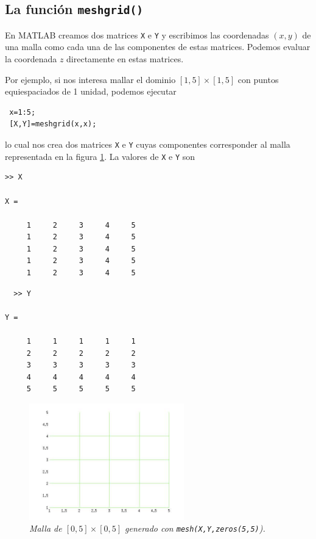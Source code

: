 \documentclass[11pt]{article}
\begin{document}
\subsection{La funci\'on \texttt{meshgrid()}}

En MATLAB creamos dos matrices \texttt{X} e \texttt{Y} y escribimos las coordenadas $(x,y)$ 
de una malla como cada una de las componentes de estas matrices. Podemos evaluar la coordenada $z$ directamente 
en estas matrices.

Por ejemplo, si nos interesa mallar el dominio $[1,5]\times[1,5]$ con puntos equiespaciados 
de 1 unidad, podemos ejecutar
\begin{verbatim}
 x=1:5;
 [X,Y]=meshgrid(x,x);
\end{verbatim}
lo cual nos crea dos matrices \texttt{X} e \texttt{Y} cuyas componentes corresponder al malla representada en 
la figura \ref{fig:malla}. La valores de \texttt{X} e \texttt{Y} son

\begin{minipage}{0.4\textwidth}
 \begin{verbatim}
>> X

X =

     1     2     3     4     5
     1     2     3     4     5
     1     2     3     4     5
     1     2     3     4     5
     1     2     3     4     5

 \end{verbatim}
\end{minipage}  
\begin{minipage}{0.4\textwidth}
 \begin{verbatim}
  >> Y

Y =

     1     1     1     1     1
     2     2     2     2     2
     3     3     3     3     3
     4     4     4     4     4
     5     5     5     5     5

 \end{verbatim}
\end{minipage}
      \begin{figure}[htp]
      \begin{center}
      \includegraphics[width=0.6\textwidth]{./malla5.jpg}
      \caption{\sl Malla de $[0,5]\times[0,5]$ generado con \texttt{mesh(X,Y,zeros(5,5)}).}
      \label{fig:malla}
      \end{center}
      \end{figure}
\end{document}
